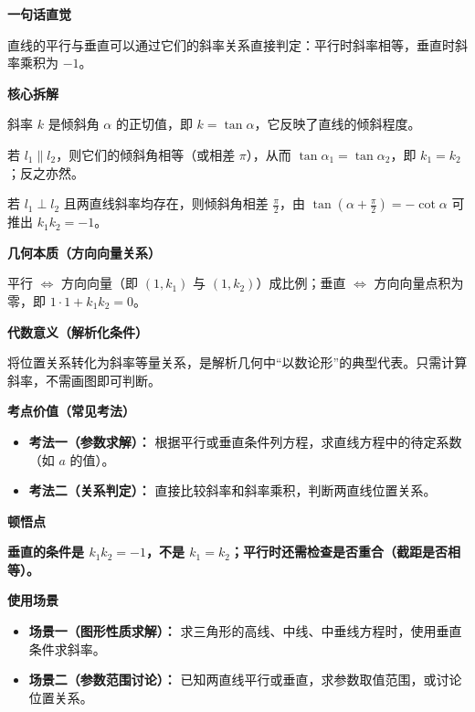 \begin{explanationbox}
	\textbf{\textcolor{CExplanation}{一句话直觉}}

	直线的平行与垂直可以通过它们的斜率关系直接判定：平行时斜率相等，垂直时斜率乘积为 $-1$。

	\medskip
	\textbf{\textcolor{CExplanation}{核心拆解}}
	\begin{description}[style=nextline, leftmargin=2.8em, labelsep=0.5em, itemsep=0.45em]
		\item[\textbf{要点一（斜率的意义）：}] 斜率 $k$ 是倾斜角 $\alpha$ 的正切值，即 $k = \tan\alpha$，它反映了直线的倾斜程度。
		\item[\textbf{要点二（平行条件）：}] 若 $l_1 \parallel l_2$，则它们的倾斜角相等（或相差 $\pi$），从而 $\tan\alpha_1 = \tan\alpha_2$，即 $k_1 = k_2$；反之亦然。
		\item[\textbf{要点三（垂直条件）：}] 若 $l_1 \perp l_2$ 且两直线斜率均存在，则倾斜角相差 $\frac{\pi}{2}$，由 $\tan(\alpha+\frac{\pi}{2}) = -\cot\alpha$ 可推出 $k_1k_2 = -1$。
	\end{description}

	\medskip
	\textbf{\textcolor{CExplanation}{几何本质（方向向量关系）}}

	平行 $\Longleftrightarrow$ 方向向量（即 $(1,k_1)$ 与 $(1,k_2)$）成比例；垂直 $\Longleftrightarrow$ 方向向量点积为零，即 $1\cdot1 + k_1k_2 = 0$。

	\medskip
	\textbf{\textcolor{CExplanation}{代数意义（解析化条件）}}

	将位置关系转化为斜率等量关系，是解析几何中“以数论形”的典型代表。只需计算斜率，不需画图即可判断。

	\medskip
	\textbf{\textcolor{CExplanation}{考点价值（常见考法）}}
	\begin{itemize}[leftmargin=*, itemsep=0.5em, topsep=0.4em]
		\item \textbf{考法一（参数求解）：} 根据平行或垂直条件列方程，求直线方程中的待定系数（如 $a$ 的值）。
		\item \textbf{考法二（关系判定）：} 直接比较斜率和斜率乘积，判断两直线位置关系。
	\end{itemize}

	\medskip
	\textbf{\textcolor{CExplanation}{顿悟点}}

	\textbf{垂直的条件是 $k_1k_2=-1$，不是 $k_1=k_2$；平行时还需检查是否重合（截距是否相等）。}

	\medskip
	\textbf{\textcolor{CExplanation}{使用场景}}
	\begin{itemize}[leftmargin=*, itemsep=0.5em, topsep=0.4em]
		\item \textbf{场景一（图形性质求解）：} 求三角形的高线、中线、中垂线方程时，使用垂直条件求斜率。
		\item \textbf{场景二（参数范围讨论）：} 已知两直线平行或垂直，求参数取值范围，或讨论位置关系。
	\end{itemize}
\end{explanationbox}
